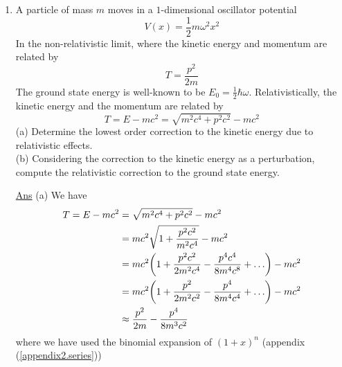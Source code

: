 \begin{enumerate}[label=Problem.\arabic*,start=1]
			
			\item 
			A particle of mass $m$ moves in a $1$-dimensional oscillator potential
			\begin{equation}
				V(x) = \frac{1}{2} m \omega^2 x^2
			\end{equation}
			In the non-relativistic limit, where the kinetic energy and momentum are related by
			\begin{equation}
				T = \frac{p^2}{2 m}
			\end{equation}
			The ground state energy is well-known to be $E_0=\frac{1}{2} \hbar \omega$. Relativistically, the kinetic energy and the momentum are related by
			\begin{equation}
				T = E - m c^2 = \sqrt{m^2 c^4 + p^2 c^2} - m c^2
			\end{equation}
			(a) Determine the lowest order correction to the kinetic energy due to relativistic effects.\\
			(b) Considering the correction to the kinetic energy as a perturbation, compute the relativistic correction to the ground state energy.
			
			\underline{Ans}
			(a) We have
			\begin{align*}
				T = E - mc^2 &= \sqrt{m^2 c^4 + p^2 c^2} - m c^2 \\
				&= mc^2 \sqrt{1 + \frac{p^2c^2}{m^2 c^4}} - mc^2 \\
				&= mc^2 \qty(1 + \frac{p^2 c^2}{2 m^2 c^4} - \frac{p^4 c^4}{8 m^4 c^8} + \ldots) - mc^2 \\
				&= mc^2 \qty(1 + \frac{p^2}{2 m^2 c^2} - \frac{p^4 }{8 m^4 c^4} + \ldots) - mc^2 \\
				&\approx \frac{p^2}{2 m} - \frac{p^4}{8 m^3 c^2}
			\end{align*}
			where we have used the binomial expansion of $(1+x)^n$ (appendix (\ref{appendix2.series}))
			

\end{enumerate}
